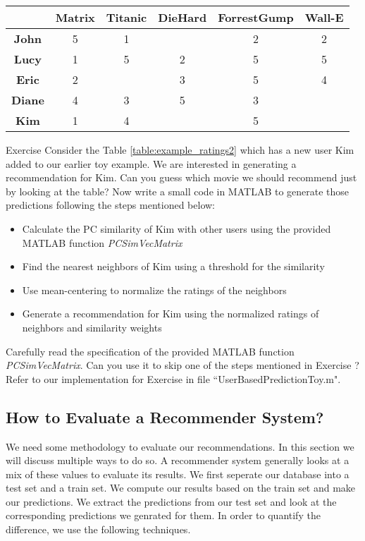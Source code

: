 \begin{table*}
\centering
\begin{tabular}{|c|c|c|c|c|c|}
\hline
\textbf{} 			& \textbf{Matrix} & \textbf{Titanic} & \textbf{DieHard} & \textbf{ForrestGump} & \textbf{Wall-E}\\ 
\hline
\textbf{John} 		& 	 	5		  & 		1		 & 				    &   	2			   & 		2		\\ 
\hline
\textbf{Lucy} 		& 	 	1		  & 		5		 & 		2		    &   	5			   & 		5		\\ 
\hline
\textbf{Eric} 		& 	 	2		  & 				 & 		3		    &   	5			   & 		4		\\ 
\hline
\textbf{Diane} 		& 	 	4		  & 		3		 & 		5		    &   	3			   & 				\\ 
\hline
\textbf{Kim} 		& 	 	1		  & 		4		 & 				    &   	5			   & 				\\ 
\hline
\end{tabular}
\caption{Example ratings}
\label{table:example_ratings2}
\end{table*}

\begin{myremark}{Exercise }
Consider the Table \ref{table:example_ratings2} which has a new user Kim added to our earlier toy example. We are interested in generating a recommendation for Kim. Can you guess which movie we should recommend just by looking at the table? Now write a small code in MATLAB to generate those predictions following the steps mentioned below:
\begin{itemize}
\item{}Calculate the PC similarity of Kim with other users using the provided MATLAB function \textit{PCSimVecMatrix}
\item{}Find the nearest neighbors of Kim using a threshold for the similarity
\item{}Use mean-centering to normalize the ratings of the neighbors 
\item{}Generate a recommendation for Kim using the normalized ratings of neighbors and similarity weights
\end{itemize}
\end{myremark}
Carefully read the specification of the provided MATLAB function \textit{PCSimVecMatrix}. Can you use it to skip one of the steps mentioned in Exercise ? Refer to our implementation for Exercise  in file ``UserBasedPredictionToy.m".
\subsection{How to Evaluate a Recommender System?}
We need some methodology to evaluate our recommendations. In this section we will discuss multiple ways to do so. A recommender system generally looks at a mix of these values to evaluate its results. We first seperate our database into a test set and a train set. We compute our results based on the train set and make our predictions. We extract the predictions from our test set and look at the corresponding predictions we genrated for them. In order to quantify the difference, we use the following techniques.
